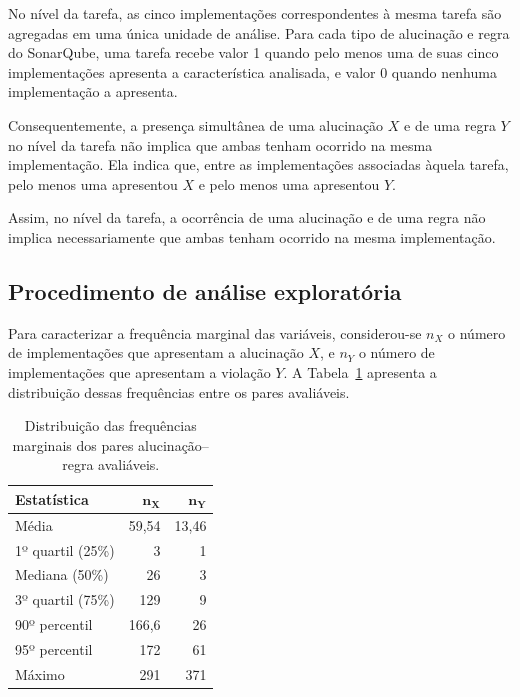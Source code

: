 No nível da tarefa, as cinco implementações correspondentes à mesma
tarefa são agregadas em uma única unidade de análise. Para cada tipo
de alucinação e regra do SonarQube, uma tarefa recebe valor 1 quando
pelo menos uma de suas cinco implementações apresenta a característica
analisada, e valor 0 quando nenhuma implementação a apresenta.

Consequentemente, a presença simultânea de uma alucinação $X$ e de uma
regra $Y$ no nível da tarefa não implica que ambas tenham ocorrido na
mesma implementação. Ela indica que, entre as implementações associadas
àquela tarefa, pelo menos uma apresentou $X$ e pelo menos uma apresentou
$Y$.

Assim, no nível da tarefa, a ocorrência de uma alucinação e de uma regra não implica necessariamente que ambas tenham ocorrido na mesma implementação.

\subsection{Procedimento de análise exploratória}

Para caracterizar a frequência marginal das variáveis, considerou-se
$n_X$ o número de implementações que apresentam
a alucinação $X$, e $n_Y$ o número de
implementações que apresentam a violação $Y$.
A Tabela~\ref{tab:distribuicao_frequencias_marginais} apresenta a
distribuição dessas frequências entre os pares avaliáveis. 

\begin{table}[ht]
    \centering
    \caption{Distribuição das frequências marginais dos pares 
    alucinação--regra avaliáveis.}
    \label{tab:distribuicao_frequencias_marginais}
    
    \begin{tabular}{lrr}
        \hline
        \textbf{Estatística} 
        & $\boldsymbol{n_X}$ 
        & $\boldsymbol{n_Y}$ \\
        \hline
        
        Média              & 59,54  & 13,46 \\
        1º quartil (25\%)  & 3      & 1     \\
        Mediana (50\%)     & 26     & 3     \\
        3º quartil (75\%)  & 129    & 9     \\
        90º percentil      & 166,6  & 26    \\
        95º percentil      & 172    & 61    \\
        Máximo             & 291    & 371   \\
        
        \hline
    \end{tabular}
\end{table}\label{tab1_esparcidade}

